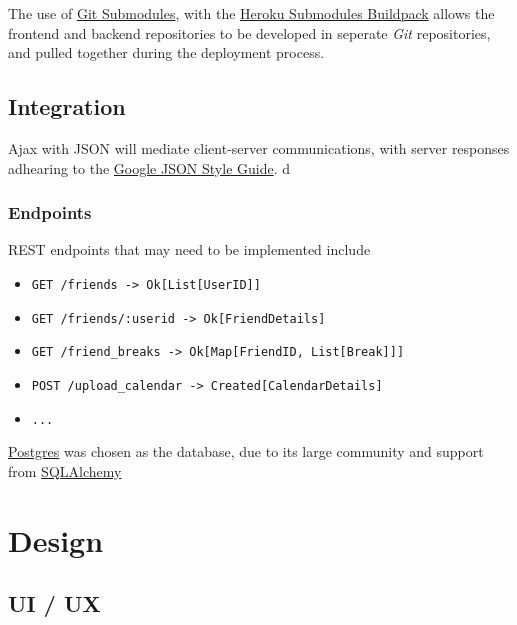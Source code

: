 \documentclass[8pt,a4paper]{report}
\begin{document}
The use of \href{https://git-scm.com/book/en/v2/Git-Tools-Submodules}{Git Submodules}, with the \href{https://github.com/dmathieu/heroku-buildpack-submodules}{Heroku Submodules Buildpack} allows the frontend and backend repositories to be developed in seperate \textit{Git} repositories, and pulled together during the deployment process.


\section{Integration}

Ajax with JSON will mediate client-server communications, with server responses adhearing to the \href{https://google.github.io/styleguide/jsoncstyleguide.xml}{Google JSON Style Guide}. d

\subsection{Endpoints}

REST endpoints that may need to be implemented include

\begin{itemize}
    \item \texttt{GET /friends -> Ok[List[UserID]]}
    \item \texttt{GET /friends/:userid -> Ok[FriendDetails]}
    \item \texttt{GET /friend\_breaks -> Ok[Map[FriendID, List[Break]]]}
    \item \texttt{POST /upload\_calendar -> Created[CalendarDetails]}
    \item \texttt{...}
\end{itemize}

\href{https://www.postgresql.org/}{Postgres} was chosen as the database, due to its large community and support from \href{https://www.sqlalchemy.org/}{SQLAlchemy}

\chapter{Design}

\section{UI / UX}
\end{document}
